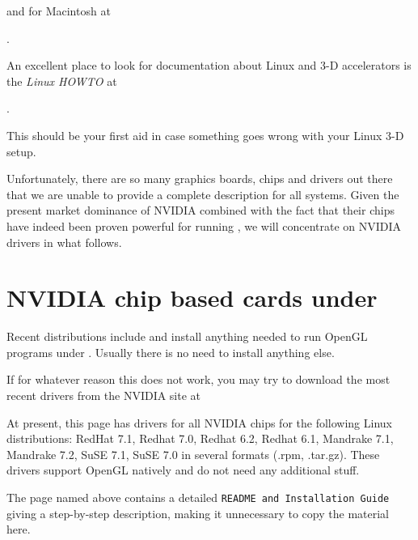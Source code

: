 \medskip

 \noindent
 and for Macintosh at
  \medskip

.
 \medskip

 \noindent
An excellent place to look for documentation about Linux and 3-D accelerators is the {\it
Linux  HOWTO} at
 \medskip

.
 \medskip

\noindent
 This should be your first aid in case something goes wrong with your Linux 3-D setup.

Unfortunately, there are so many graphics boards, chips and drivers out there that we are
unable to provide a complete description for all systems. Given the present market
dominance of NVIDIA combined with the fact that their chips have indeed been proven
powerful for running \FlightGear{}$\!$, we will concentrate on NVIDIA
drivers in what follows.

\section{NVIDIA chip based cards under \label{nvidialinux}}
Recent  distributions include and install anything needed to run OpenGL
programs under . Usually there is no need to install anything else.

If for whatever reason this does not work, you may try to download the most recent
drivers from the NVIDIA site at
 \medskip

 \medskip

 \noindent
At present, this page has drivers for all NVIDIA chips for the following Linux
distributions: RedHat 7.1, Redhat 7.0, Redhat 6.2, Redhat
6.1, Mandrake 7.1, Mandrake 7.2, SuSE 7.1, SuSE 7.0 in several formats (.rpm, .tar.gz).
These drivers support OpenGL natively and do not need any additional stuff.

The page named above contains a detailed \texttt{README and Installation Guide} giving a
step-by-step description, making it unnecessary to copy the material here.

